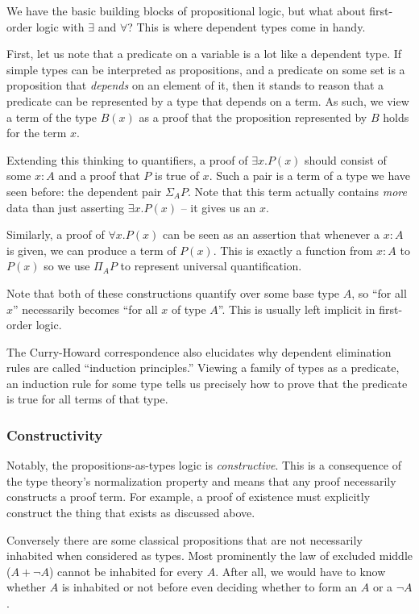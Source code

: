 We have the basic building blocks of propositional logic, but what about
first-order logic with $\exists$ and $\forall$? This is where dependent
types come in handy.

First, let us note that a predicate on a variable is a lot like a dependent
type. If simple types can be interpreted as propositions, and a predicate on
some set is a proposition that \emph{depends} on an element of it, then it stands
to reason that a predicate can be represented by a type that depends on a term. As such, we
view a term of the type $B(x)$ as a proof that the proposition represented by
$B$ holds for the term $x$.

Extending this thinking to quantifiers, a proof of $\exists x. P(x)$ should
consist of some $x:A$ and a proof that $P$ is true of $x$.
Such a pair is a term of a type we have seen before:
the dependent pair $\Sigma_A P$. Note that this term actually contains
\emph{more} data than just asserting $\exists x. P(x)$ -- it gives us an $x$.

Similarly, a proof of $\forall x. P(x)$ can be seen as an assertion that
whenever a $x:A$ is given, we can produce a term of $P(x)$. This is
exactly a function from $x:A$ to $P(x)$ so we use $\Pi_A P$ to represent universal
quantification.

Note that both of these constructions quantify over some base type $A$, so ``for
all $x$'' necessarily becomes ``for all $x$ of type $A$''. This is usually left
implicit in first-order logic.

The Curry-Howard correspondence also elucidates why dependent elimination rules
are called ``induction principles.'' Viewing a family of types as a predicate,
an induction rule for some type tells us precisely how to prove that the
predicate is true for all terms of that type.

\subsubsection{Constructivity}
Notably, the propositions-as-types logic is \emph{constructive}. This is a
consequence of the type theory's normalization property and means that
any proof necessarily constructs a proof term. For example, a proof of
existence must explicitly construct the thing that exists as discussed above.

Conversely there are some classical propositions that are not necessarily inhabited when
considered as types. Most prominently the law of excluded middle ($A + \neg A$)
cannot be inhabited for every $A$. After all, we would have to know whether $A$
is inhabited or not before even deciding whether to form an $A$ or a $\neg A$.
